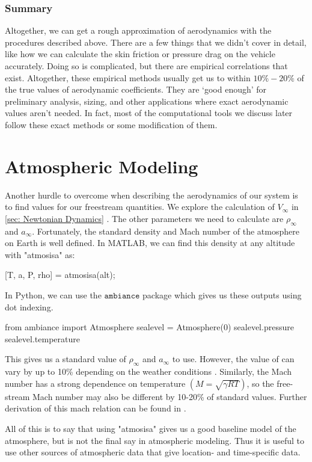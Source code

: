 \documentclass[10pt, openany, titlepage]{book}
\theoremstyle{definition}
\let\oldautoref\autoref
\renewcommand{\autoref}[1]{%
  \begingroup
  \hypersetup{linkcolor=black}%
  \oldautoref{#1}%
  \endgroup
}
\begin{document}
\subsubsection{Summary}
Altogether, we can get a rough approximation of aerodynamics with the procedures described above. There are a few things that we didn't cover in detail, like how we can calculate the skin friction or pressure drag on the vehicle accurately. Doing so is complicated, but there are empirical correlations that exist. Altogether, these empirical methods usually get us to within $10\%-20\%$ of the true values of aerodynamic coefficients. They are `good enough' for preliminary analysis, sizing, and other applications where exact aerodynamic values aren't needed. In fact, most of the computational tools we discuss later follow these exact methods or some modification of them.

\section{Atmospheric Modeling}
Another hurdle to overcome when describing the aerodynamics of our system is to find values for our \gls{freestream} quantities. We explore the calculation of $V_{\infty}$ in \autoref{sec: Newtonian Dynamics}. The other parameters we need to calculate are $\rho_{\infty}$ and $a_{\infty}$. Fortunately, the standard density and Mach number of the atmosphere on Earth is well defined. In MATLAB, we can find this density at any altitude with "atmosisa" as:
\begin{matlabscript}{}
[T, a, P, rho] = atmosisa(alt);
\end{matlabscript}
In Python, we can use the $\texttt{ambiance}$ package which gives us these outputs using dot indexing.
\begin{pythonscript}{}
from ambiance import Atmosphere
sealevel = Atmosphere(0)
sealevel.pressure
sealevel.temperature
\end{pythonscript}

This gives us a standard value of $\rho_{\infty}$ and $a_{\infty}$ to use. However, the value of can vary by up to 10\% depending on the weather conditions \cite{svickova_air_2020}. Similarly, the Mach number has a strong dependence on temperature $\left(M=\sqrt{\gamma RT}\right)$, so the free-stream Mach number may also be different by 10-20\% of standard values. Further derivation of this mach relation can be found in \cite{filmer_fluid_nodate}.

All of this is to say that using "atmosisa" gives us a good baseline model of the atmosphere, but is not the final say in atmospheric modeling. Thus it is useful to use other sources of atmospheric data that give location- and time-specific data.
\end{document}
